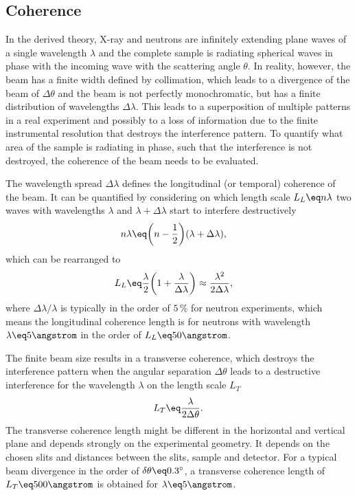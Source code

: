 \documentclass[\main/dresen_thesis.tex]{subfiles}
\begin{document}
  \subsection{Coherence}\label{sec:theoreticalBackground:scattering:CoherenceInstrumentalResolution}

    In the derived theory, X-ray and neutrons are infinitely extending plane waves of a single wavelength $\lambda$ and the complete sample is radiating spherical waves in phase with the incoming wave with the scattering angle $\theta$.
    In reality, however, the beam has a finite width defined by collimation, which leads to a divergence of the beam of $\Delta \theta$ and the beam is not perfectly monochromatic, but has a finite distribution of wavelengths $\Delta \lambda$.
    This leads to a superposition of multiple patterns in a real experiment and possibly to a loss of information due to the finite instrumental resolution that destroys the interference pattern.
    To quantify what area of the sample is radiating in phase, such that the interference is not destroyed, the coherence of the beam needs to be evaluated.

    The wavelength spread $\Delta \lambda$ defines the longitudinal (or temporal) coherence of the beam. It can be quantified by considering on which length scale $L_L \eq n \lambda$ two waves with wavelengths $\lambda$ and $\lambda + \Delta \lambda$ start to interfere destructively
    \begin{align}
      n\lambda \eq& \biggl(n - \frac{1}{2} \biggr)(\lambda + \Delta \lambda),
    \end{align}
    which can be rearranged to
    \begin{align}
      L_L \eq& \frac{\lambda}{2} \biggl(1 + \frac{\lambda}{\Delta \lambda} \biggr) \approx \frac{\lambda^2}{2 \Delta \lambda},
    \end{align}
    where $\Delta \lambda / \lambda$ is typically in the order of $5\, \%$ for neutron experiments, which means the longitudinal coherence length is for neutrons with wavelength $\lambda \eq 5 \angstrom$ in the order of $L_L \eq 50 \angstrom$.

    The finite beam size results in a transverse coherence, which destroys the interference pattern when the angular separation $\Delta \theta$ leads to a destructive interference for the wavelength $\lambda$ on the length scale $L_T$
    \begin{align}
      L_T \eq \frac{\lambda}{2 \Delta\theta}.
    \end{align}
    The transverse coherence length might be different in the horizontal and vertical plane and depends strongly on the experimental geometry.
    It depends on the chosen slits and distances between the slits, sample and detector.
    For a typical beam divergence in the order of $\delta \theta \eq 0.3^\circ$, a transverse coherence length of $L_T \eq 500 \angstrom$ is obtained for $\lambda \eq 5 \angstrom$.
\end{document}
